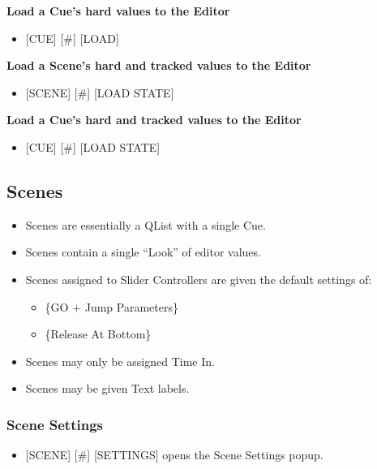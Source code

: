 \documentclass[
]{article}
\providecommand{\tightlist}{%
  \setlength{\itemsep}{0pt}\setlength{\parskip}{0pt}}
\begin{document}
\textbf{Load a Cue's hard values to the Editor}

\begin{itemize}
\tightlist
\item
  {[}CUE{]} {[}\#{]} {[}LOAD{]}
\end{itemize}

\textbf{Load a Scene's hard and tracked values to the Editor}

\begin{itemize}
\tightlist
\item
  {[}SCENE{]} {[}\#{]} {[}LOAD STATE{]}
\end{itemize}

\textbf{Load a Cue's hard and tracked values to the Editor}

\begin{itemize}
\tightlist
\item
  {[}CUE{]} {[}\#{]} {[}LOAD STATE{]}
\end{itemize}

\hypertarget{Scenes-10.2}{%
\subsection{Scenes}\label{Scenes-10.2}}

\begin{itemize}
\item
  Scenes are essentially a QList with a single Cue.
\item
  Scenes contain a single ``Look'' of editor values.
\item
  Scenes assigned to Slider Controllers are given the default settings of:

  \begin{itemize}
  \item
    \{GO + Jump Parameters\}
  \item
    \{Release At Bottom\}
  \end{itemize}
\item
  Scenes may only be assigned Time In.
\item
  Scenes may be given Text labels.
\end{itemize}

\hypertarget{scene-settings-1}{%
\subsubsection{Scene Settings}\label{scene-settings-1}}

\begin{itemize}
\tightlist
\item
  {[}SCENE{]} {[}\#{]} {[}SETTINGS{]} opens the Scene Settings popup.
\end{itemize}
\end{document}
